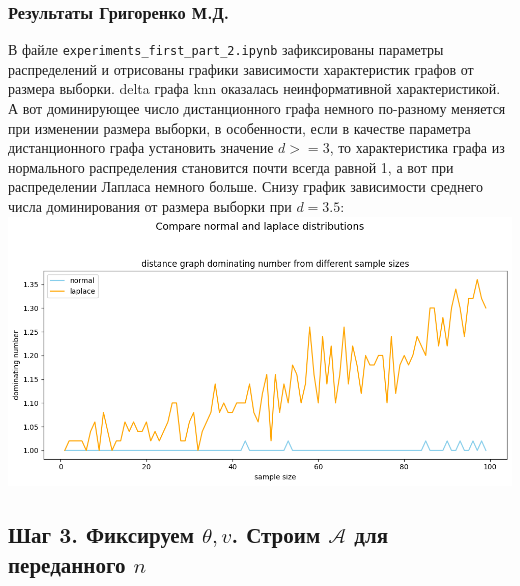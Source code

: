 \documentclass[a4paper,12pt]{article}
\begin{document}
\subsubsection*{Результаты Григоренко М.Д.}
В файле \texttt{experiments\_first\_part\_2.ipynb} зафиксированы параметры распределений и отрисованы графики зависимости характеристик графов от размера выборки. delta графа knn оказалась неинформативной характеристикой. А вот доминирующее число дистанционного графа немного по-разному меняется при изменении размера выборки, в особенности, если в качестве параметра дистанционного графа установить значение $d >= 3$, то характеристика графа из нормального распределения становится почти всегда равной 1, а вот при распределении Лапласа немного больше. Снизу график зависимости среднего числа доминирования от размера выборки при $d = 3.5$: \newline
\includegraphics[width=\textwidth]{images/dominating_number_plot.png}

\subsection{Шаг 3. Фиксируем $\theta, v$. Строим $\mathcal{A}$ для переданного $n$}
\end{document}
